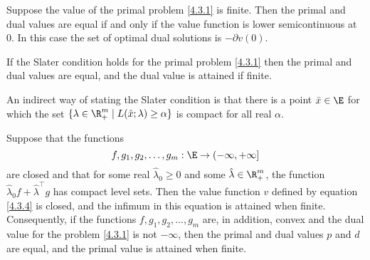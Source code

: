 \documentclass[../borwein-lewis_notes.tex]{subfiles}
\begin{document}
\begin{corollary}
Suppose the value of the primal problem \eqref{4.3.1} is finite. Then
the primal and dual values are equal if and only if the value function
is lower semicontinuous at 0. In this case the set of optimal 
dual solutions is $-\partial v(0)$.
\label{4.3.6}
\end{corollary}
\begin{theorem}
If the Slater condition holds for the primal problem \eqref{4.3.1} 
then the primal and dual values are equal, and the dual value is 
attained if finite. 
\label{4.3.7}
\end{theorem}
An indirect way of stating the Slater condition is that there is a point 
$\bar x\in\E$ for which the set $\{\lambda\in\R_+^m\mid L(\hat x;
\lambda)\geq\alpha\}$ is compact for all real $\alpha$.
\begin{theorem}
Suppose that the functions 
\begin{equation*}
f, g_1, g_2,\ldots, g_m : \E\to(-\infty,+\infty]
\end{equation*}
are closed and that for some real $\hat\lambda_0\geq 0$ and some 
$\hat\lambda\in\R_+^m$, the function $\hat\lambda_0 f+\hat\lambda^\top
g$ has compact level sets. Then the value function $v$ defined by 
equation \eqref{4.3.4} is closed, and the infimum in this equation is 
attained when finite. Consequently, if the functions $f,g_1,g_2,
\ldots, g_m$ are, in addition, convex and the dual value for the 
problem \eqref{4.3.1} is not $-\infty$, then the primal and dual values 
$p$ and $d$ are equal, and the primal value is attained when finite.
\label{4.3.8}
\end{theorem}
\end{document}
